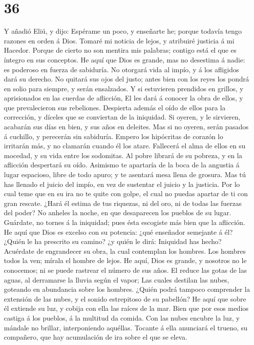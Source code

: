\hypertarget{section-35}{%
\section{36}\label{section-35}}

 Y añadió Eliú, y dijo:  Espérame un poco, y
enseñarte he; porque todavía tengo razones en orden á Dios. 
Tomaré mi noticia de lejos, y atribuiré justicia á mi Hacedor.
 Porque de cierto no son mentira mis palabras; contigo está
el que es íntegro en sus conceptos.  He aquí que Dios es
grande, mas no desestima á nadie: es poderoso en fuerza de sabiduría.
 No otorgará vida al impío, y á los afligidos dará su
derecho.  No quitará sus ojos del justo; antes bien con los
reyes los pondrá en solio para siempre, y serán ensalzados. 
Y si estuvieren prendidos en grillos, y aprisionados en las cuerdas de
aflicción,  El les dará á conocer la obra de ellos, y que
prevalecieron sus rebeliones.  Despierta además el oído de
ellos para la corrección, y díceles que se conviertan de la iniquidad.
 Si oyeren, y le sirvieren, acabarán sus días en bien, y
sus años en deleites.  Mas si no oyeren, serán pasados á
cuchillo, y perecerán sin sabiduría.  Empero los hipócritas
de corazón lo irritarán más, y no clamarán cuando él los atare.
 Fallecerá el alma de ellos en su mocedad, y su vida entre
los sodomitas.  Al pobre librará de su pobreza, y en la
aflicción despertará su oído.  Asimismo te apartaría de la
boca de la angustia á lugar espacioso, libre de todo apuro; y te
asentará mesa llena de grosura.  Mas tú has llenado el
juicio del impío, en vez de sustentar el juicio y la justicia.
 Por lo cual teme que en su ira no te quite con golpe, el
cual no puedas apartar de ti con gran rescate.  ¿Hará él
estima de tus riquezas, ni del oro, ni de todas las fuerzas del poder?
 No anheles la noche, en que desaparecen los pueblos de su
lugar.  Guárdate, no tornes á la iniquidad; pues ésta
escogiste más bien que la aflicción.  He aquí que Dios es
excelso con su potencia: ¿qué enseñador semejante á él? 
¿Quién le ha prescrito su camino? ¿y quién le dirá: Iniquidad has hecho?
 Acuérdate de engrandecer su obra, la cual contemplan los
hombres.  Los hombres todos la ven; mírala el hombre de
lejos.  He aquí, Dios es grande, y nosotros no le
conocemos; ni se puede rastrear el número de sus años.  El
reduce las gotas de las aguas, al derramarse la lluvia según el vapor;
 Las cuales destilan las nubes, goteando en abundancia
sobre los hombres.  ¿Quién podrá tampoco comprender la
extensión de las nubes, y el sonido estrepitoso de su pabellón?
 He aquí que sobre él extiende su luz, y cobija con ella
las raíces de la mar.  Bien que por esos medios castiga á
los pueblos, á la multitud da comida.  Con las nubes
encubre la luz, y mándale no brillar, interponiendo aquéllas.
 Tocante á ella anunciará el trueno, su compañero, que hay
acumulación de ira sobre el que se eleva.

